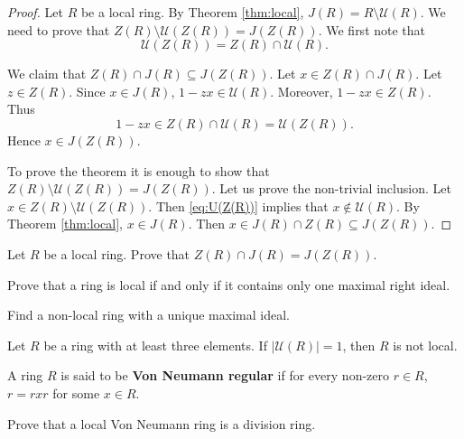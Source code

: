 \begin{proof}
    Let $R$ be a local ring. By Theorem \ref{thm:local}, $J(R)=R\setminus\mathcal{U}(R)$.  
    We need to prove that $Z(R)\setminus\mathcal{U}(Z(R))=J(Z(R))$. 
    We first note that
    \begin{equation}
    \label{eq:U(Z(R))}
        \mathcal{U}(Z(R))=Z(R)\cap\mathcal{U}(R).
    \end{equation}
    
    We claim that $Z(R)\cap J(R)\subseteq J(Z(R))$.  
    Let $x\in Z(R)\cap J(R)$. Let $z\in Z(R)$. Since $x\in J(R)$, $1-zx\in\mathcal{U}(R)$.
    Moreover, $1-zx\in Z(R)$. Thus 
    \[
    1-zx\in Z(R)\cap\mathcal{U}(R)=\mathcal{U}(Z(R)).
    \]
    Hence $x\in J(Z(R))$. 

    To prove the theorem it is enough to show that 
    $Z(R)\setminus\mathcal{U}(Z(R))=J(Z(R))$. Let us prove the non-trivial inclusion. 
    Let $x\in Z(R)\setminus\mathcal{U}(Z(R))$.  Then 
    \eqref{eq:U(Z(R))} implies that 
    $x\not\in\mathcal{U}(R)$. 
    By Theorem \ref{thm:local}, 
    $x\in J(R)$. Then $x\in J(R)\cap Z(R)\subseteq J(Z(R))$. 
\end{proof}

\begin{exercise}
\label{eq:local_center}
    Let $R$ be a local ring. Prove that 
    $Z(R)\cap J(R)=J(Z(R))$.  
\end{exercise}

\begin{exercise}
\label{xca:local_right}
    Prove that a ring is local if and only if it contains only one maximal right ideal.
\end{exercise}

\begin{exercise}
\label{xca:non_local1}
    Find a non-local ring with a unique maximal ideal. 
\end{exercise}

\begin{exercise}
\label{xca:non_local2}
    Let $R$ be a ring with at least three elements. 
    If $|\mathcal{U}(R)|=1$, then $R$ is not local. 
\end{exercise}

A ring $R$ is said to be \textbf{Von Neumann regular} if  
for every non-zero $r\in R$, $r=rxr$ for some $x\in R$. 

\begin{exercise}
\label{xca:VonNeumann_local}
    Prove that a local Von Neumann ring is a division ring. 
\end{exercise}


